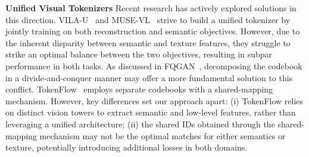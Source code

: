 \textbf{Unified Visual Tokenizers}\quad
Recent research has actively explored solutions in this direction. VILA-U~\citep{wu2025vilau} and MUSE-VL~\citep{xie2025musevl} strive to build a unified tokenizer by jointly training on both reconstruction and semantic objectives.
However, due to the inherent disparity between semantic and texture features, they struggle to strike an optimal balance between the two objectives, resulting in subpar performance in both tasks.
As discussed in FQGAN~\citep{bai2024fqgan}, decomposing the codebook in a divide-and-conquer manner may offer a more fundamental solution to this conflict.
TokenFlow~\citep{qu2024tokenflow} employs separate codebooks with a shared-mapping mechanism. However, key differences set our approach apart: (i) TokenFlow relies on distinct vision towers to extract semantic and low-level features, rather than leveraging a unified architecture; (ii) the shared IDs obtained through the shared-mapping mechanism may not be the optimal matches for either semantics or texture, potentially introducing additional losses in both domains.
